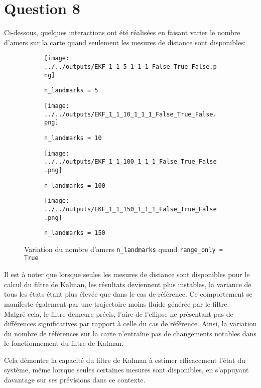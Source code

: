 \documentclass[../CSC_5RO12_TA_TP2.tex]{subfiles}
\begin{document}
\section{Question 8}
\noindent Ci-dessous, quelques interactions ont été réalisées en faisant varier le nombre d'amers sur la carte quand seulement les mesures de distance sont disponibles:
\begin{figure}[H]
    \centering
    \begin{subfigure}[b]{0.475\textwidth}
        \centering
        \texttt{[image: ../../outputs/EKF\_1\_1\_5\_1\_1\_1\_False\_True\_False.png]}
        \caption{\texttt{n\_landmarks = 5}}
        \label{}
    \end{subfigure}\hfill
    \begin{subfigure}[b]{0.475\textwidth}
        \centering
        \texttt{[image: ../../outputs/EKF\_1\_1\_10\_1\_1\_1\_False\_True\_False.png]}
        \caption{\texttt{n\_landmarks = 10}}
        \label{}
    \end{subfigure}
    \begin{subfigure}[b]{0.475\textwidth}
        \centering
        \texttt{[image: ../../outputs/EKF\_1\_1\_100\_1\_1\_1\_False\_True\_False.png]}
        \caption{\texttt{n\_landmarks = 100}}
        \label{}
    \end{subfigure}\hfill
    \begin{subfigure}[b]{0.475\textwidth}
        \centering
        \texttt{[image: ../../outputs/EKF\_1\_1\_150\_1\_1\_1\_False\_True\_False.png]}
        \caption{\texttt{n\_landmarks = 150}}
        \label{}
    \end{subfigure}
    \caption{Variation du nombre d'amers \texttt{n\_landmarks} quand \texttt{range\_only = True}}
    \label{}
\end{figure}
\noindent Il est à noter que lorsque seules les mesures de distance sont disponibles pour le calcul du filtre de Kalman, les résultats deviennent plus instables, la variance de tous les états étant plus élevée que dans le cas de référence. Ce comportement se manifeste également par une trajectoire moins fluide générée par le filtre.\\

\noindent Malgré cela, le filtre demeure précis, l'aire de l'ellipse ne présentant pas de différences significatives par rapport à celle du cas de référence. Ainsi, la variation du nombre de références sur la carte n'entraîne pas de changements notables dans le fonctionnement du filtre de Kalman.
\begin{remark}
    Cela démontre la capacité du filtre de Kalman à estimer efficacement l'état du système, même lorsque seules certaines mesures sont disponibles, en s'appuyant davantage sur ses prévisions dans ce contexte.
\end{remark}
\end{document}
